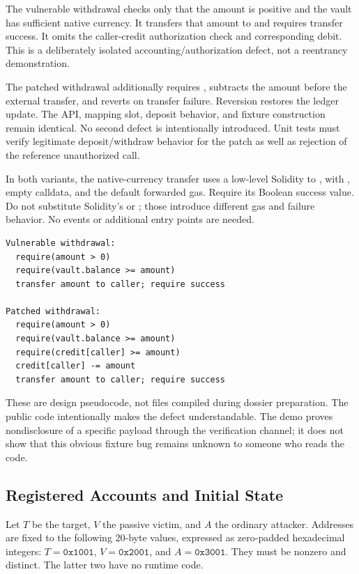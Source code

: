 \documentclass[11pt]{article}
\begin{document}
The vulnerable withdrawal checks only that the amount is positive and the vault has sufficient native currency. It transfers that amount to  and requires transfer success. It omits the caller-credit authorization check and corresponding debit. This is a deliberately isolated accounting/authorization defect, not a reentrancy demonstration.

The patched withdrawal additionally requires , subtracts the amount before the external transfer, and reverts on transfer failure. Reversion restores the ledger update. The API, mapping slot, deposit behavior, and fixture construction remain identical. No second defect is intentionally introduced. Unit tests must verify legitimate deposit/withdraw behavior for the patch as well as rejection of the reference unauthorized call.

In both variants, the native-currency transfer uses a low-level Solidity  to , with , empty calldata, and the default forwarded gas. Require its Boolean success value. Do not substitute Solidity's  or ; those introduce different gas and failure behavior. No events or additional entry points are needed.

\begin{verbatim}
Vulnerable withdrawal:
  require(amount > 0)
  require(vault.balance >= amount)
  transfer amount to caller; require success

Patched withdrawal:
  require(amount > 0)
  require(vault.balance >= amount)
  require(credit[caller] >= amount)
  credit[caller] -= amount
  transfer amount to caller; require success
\end{verbatim}

These are design pseudocode, not files compiled during dossier preparation. The public code intentionally makes the defect understandable. The demo proves nondisclosure of a specific payload through the verification channel; it does not show that this obvious fixture bug remains unknown to someone who reads the code.

\subsection{Registered Accounts and Initial State}
Let \(T\) be the target, \(V\) the passive victim, and \(A\) the ordinary attacker. Addresses are fixed to the following 20-byte values, expressed as zero-padded hexadecimal integers: \(T=\mathtt{0x1001}\), \(V=\mathtt{0x2001}\), and \(A=\mathtt{0x3001}\). They must be nonzero and distinct. The latter two have no runtime code.
\end{document}
